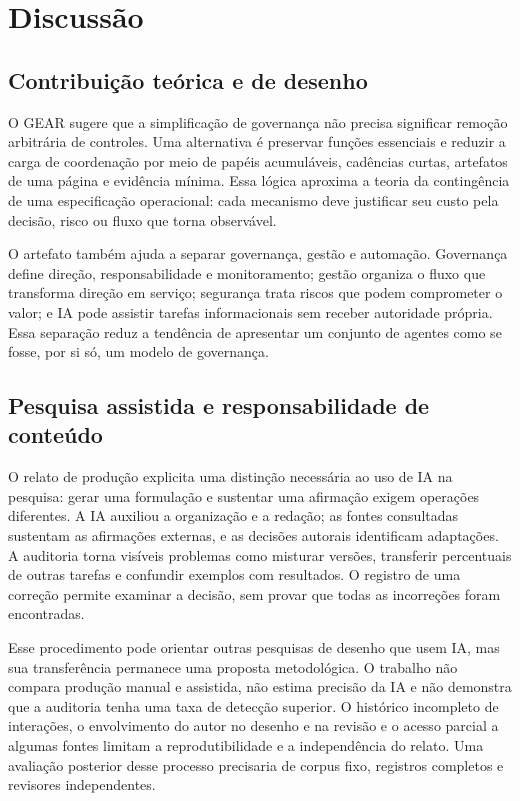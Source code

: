 \section{Discussão}
\label{sec:discussao}

\subsection{Contribuição teórica e de desenho}

O GEAR sugere que a simplificação de governança não precisa significar remoção arbitrária de controles. Uma alternativa é preservar funções essenciais e reduzir a carga de coordenação por meio de papéis acumuláveis, cadências curtas, artefatos de uma página e evidência mínima. Essa lógica aproxima a teoria da contingência de uma especificação operacional: cada mecanismo deve justificar seu custo pela decisão, risco ou fluxo que torna observável.

O artefato também ajuda a separar governança, gestão e automação. Governança define direção, responsabilidade e monitoramento; gestão organiza o fluxo que transforma direção em serviço; segurança trata riscos que podem comprometer o valor; e IA pode assistir tarefas informacionais sem receber autoridade própria. Essa separação reduz a tendência de apresentar um conjunto de agentes como se fosse, por si só, um modelo de governança.

\subsection{Pesquisa assistida e responsabilidade de conteúdo}

O relato de produção explicita uma distinção necessária ao uso de IA na pesquisa: gerar uma formulação e sustentar uma afirmação exigem operações diferentes. A IA auxiliou a organização e a redação; as fontes consultadas sustentam as afirmações externas, e as decisões autorais identificam adaptações. A auditoria torna visíveis problemas como misturar versões, transferir percentuais de outras tarefas e confundir exemplos com resultados. O registro de uma correção permite examinar a decisão, sem provar que todas as incorreções foram encontradas.

Esse procedimento pode orientar outras pesquisas de desenho que usem IA, mas sua transferência permanece uma proposta metodológica. O trabalho não compara produção manual e assistida, não estima precisão da IA e não demonstra que a auditoria tenha uma taxa de detecção superior. O histórico incompleto de interações, o envolvimento do autor no desenho e na revisão e o acesso parcial a algumas fontes limitam a reprodutibilidade e a independência do relato. Uma avaliação posterior desse processo precisaria de corpus fixo, registros completos e revisores independentes.

